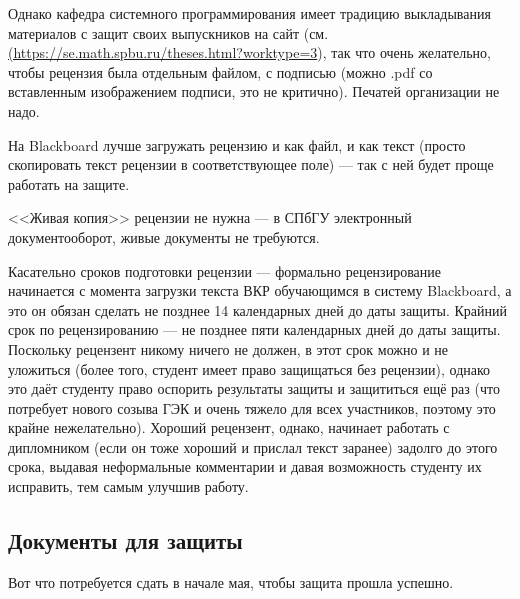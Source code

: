 \documentclass{article}
\begin{document}
Однако кафедра системного программирования имеет традицию выкладывания материалов с защит своих выпускников на сайт (см. \url{(https://se.math.spbu.ru/theses.html?worktype=3}), так что очень желательно, чтобы рецензия была отдельным файлом, с подписью (можно .pdf со вставленным изображением подписи, это не критично). Печатей организации не надо.

На Blackboard лучше загружать рецензию и как файл, и как текст (просто скопировать текст рецензии в соответствующее поле) --- так с ней будет проще работать на защите.

<<Живая копия>> рецензии не нужна --- в СПбГУ электронный документооборот, живые документы не требуются.

Касательно сроков подготовки рецензии --- формально рецензирование начинается с момента загрузки текста ВКР обучающимся в систему Blackboard, а это он обязан сделать не позднее 14 календарных дней до даты защиты. Крайний срок по рецензированию --- не позднее пяти календарных дней до даты защиты. Поскольку рецензент никому ничего не должен, в этот срок можно и не уложиться (более того, студент имеет право защищаться без рецензии), однако это даёт студенту право оспорить результаты защиты и защититься ещё раз (что потребует нового созыва ГЭК и очень тяжело для всех участников, поэтому это крайне нежелательно). Хороший рецензент, однако, начинает работать с дипломником (если он тоже хороший и прислал текст заранее) задолго до этого срока, выдавая неформальные комментарии и давая возможность студенту их исправить, тем самым улучшив работу.

\subsection{Документы для защиты}

Вот что потребуется сдать в начале мая, чтобы защита прошла успешно.
\end{document}
